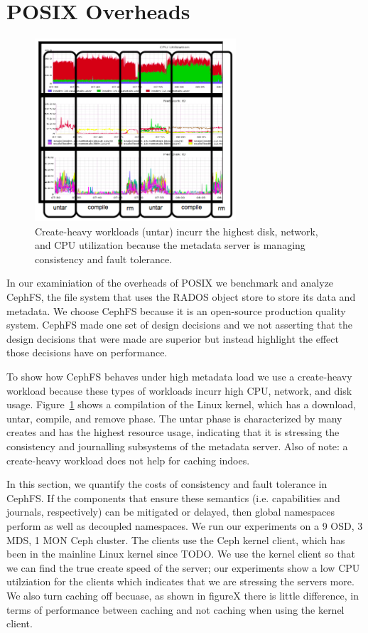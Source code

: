 \section{POSIX Overheads}

\begin{figure}[tb]
\centering
\includegraphics[width=75mm]{figures/creates-motivation.png}
\caption{Create-heavy workloads (untar) incurr the highest disk, network, and CPU
utilization because the metadata server is managing consistency and fault
tolerance.}\label{fig:creates-motivation}
\end{figure}

In our examiniation of the overheads of POSIX we benchmark and analyze CephFS,
the file system that uses the RADOS object store to store its data and
metadata. We choose CephFS because it is an open-source production quality
system. CephFS made one set of design decisions and we not asserting that the
design decisions that were made are superior but instead highlight the
effect those decisions have on performance.

To show how CephFS behaves under high metadata load we use a create-heavy
workload because these types of workloads incurr high CPU, network, and disk
usage.  Figure~\ref{fig:creates-motivation} shows a compilation of the Linux
kernel, which has a download, untar, compile, and remove phase. The untar phase
is characterized by many creates and has the highest resource usage, indicating
that it is stressing the consistency and journalling subsystems of the metadata
server. Also of note: a create-heavy workload does not help for caching indoes.

In this section, we quantify the costs of consistency and fault tolerance in
CephFS. If the components that ensure these semantics (i.e. capabilities and
journals, respectively) can be mitigated or delayed, then global namespaces
perform as well as decoupled namespaces. We run our experiments on a 9 OSD, 3
MDS, 1 MON Ceph cluster. The clients use the Ceph kernel client, which has been
in the mainline Linux kernel since TODO. We use the kernel client so that we
can find the true create speed of the server; our experiments show a low CPU
utilziation for the clients which indicates that we are stressing the servers
more. We also turn caching off becuase, as shown in figureX there is little
difference, in terms of performance between caching and not caching when using
the kernel client.

